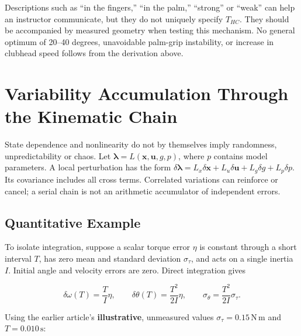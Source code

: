 \documentclass[
  11pt,
]{article}
\begin{document}
Descriptions such as ``in the fingers,'' ``in the palm,'' ``strong'' or
``weak'' can help an instructor communicate, but they do not uniquely
specify \(T_{HC}\). They should be accompanied by measured geometry when
testing this mechanism. No general optimum of 20--40 degrees,
unavoidable palm-grip instability, or increase in clubhead speed follows
from the derivation above.

\section{Variability Accumulation Through the Kinematic
Chain}\label{variability-accumulation-through-the-kinematic-chain}

State dependence and nonlinearity do not by themselves imply randomness,
unpredictability or chaos. Let
\(\boldsymbol\lambda=L(\mathbf x,\mathbf u,g,p)\), where \(p\) contains
model parameters. A local perturbation has the form
\(\delta\boldsymbol\lambda=L_x\delta\mathbf x+L_u\delta\mathbf u
+L_g\delta g+L_p\delta p\). Its covariance includes all cross terms.
Correlated variations can reinforce or cancel; a serial chain is not an
arithmetic accumulator of independent errors.

\subsection{Quantitative Example}\label{quantitative-example}

To isolate integration, suppose a scalar torque error \(\eta\) is
constant through a short interval \(T\), has zero mean and standard
deviation \(\sigma_\tau\), and acts on a single inertia \(I\). Initial
angle and velocity errors are zero. Direct integration gives

\[
\delta\omega(T)=\frac{T}{I}\eta,\qquad
\delta\theta(T)=\frac{T^2}{2I}\eta,
\qquad \sigma_\theta=\frac{T^2}{2I}\sigma_\tau.
\]

Using the earlier article's \textbf{illustrative}, unmeasured values
\(\sigma_\tau=0.15\,\mathrm{N\,m}\) and \(T=0.010\,\mathrm s\):
\end{document}
